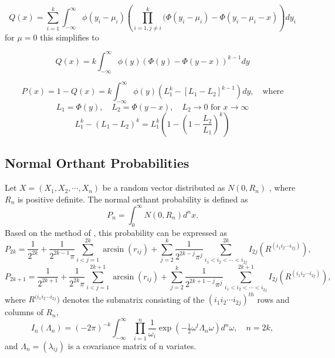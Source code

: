 \begin{equation}
	Q(x) = \sum_{i=1}^k  \int_{-\infty}^\infty \phi(y_i - \mu_i) \left( \prod_{i=1, j \neq i}^k (\Phi(y_i - \mu_i) - \Phi(y_i - \mu_i -x) \right) dy_i
\end{equation}
for $\mu=0$ this simplifies to

\begin{equation}
	Q(x) = k  \int_{-\infty}^\infty \phi(y) \left( \Phi(y) - \Phi(y-x) \right)^{k-1} dy
\end{equation}

\begin{equation}
	P(x) = 1 - Q(x) = k  \int_{-\infty}^\infty \phi(y) \left( L_1^k - [L_1 - L_2]^{k-1} \right) dy, \quad \text{where}
\end{equation}
\begin{equation}
	L_1 = \Phi(y), \quad L_2 = \Phi(y-x), \quad L_2 \rightarrow 0 \text{ for } x \rightarrow \infty
\end{equation}
\begin{equation}
	L_1^k - (L_1 - L_2)^k = L_1^k \left( 1 - \left( 1 - \frac{L_2}{L_1} \right) ^k \right) 
\end{equation}





\subsection{Normal Orthant Probabilities}
\label{NormalOrthantProbabilities}
Let $X=(X_1, X_2, \cdots , X_n)$  be a random vector distributed as $N(0,R_n)$ , where $R_n$ is positive definite. The normal orthant probability is defined as
\begin{equation}
	P_n = \int_0^\infty N(0,R_n) d^n x.
\end{equation}
Based on the method of \cite{Sun_1988_Therory, Sun_1988_Computation}, this probability can be expressed as
\begin{equation}
	P_{2k}=  \frac{1}{2^{2k}} + \frac{1}{2^{2k-1}\pi} \sum_{i<j=1}^{2k}{\arcsin(r_{ij})} + \sum_{j=2}^{k}{\frac{1}{2^{2k-j}\pi^j}}   \sum_{i_1<i_2<\cdots<i_{2j}}^{2k}{I_{2j}(R^{(i_1i_2\cdots i_{2j})})},    
\end{equation}
\begin{equation}
	P_{2k+1}=  \frac{1}{2^{2k+1}} + \frac{1}{2^{2k}\pi} \sum_{i<j=1}^{2k+1}{\arcsin(r_{ij})} + \sum_{j=2}^{k}{\frac{1}{2^{2k+1-j}\pi^j}}   \sum_{i_1<i_2<\cdots<i_{2j}}^{2k+1}{I_{2j}(R^{(i_1i_2\cdots i_{2j})})},    
\end{equation}
where $R^{(i_1i_2\cdots i_{2j}})$ denotes the submatrix consisting of the $(i_1i_2\cdots i_{2j})^{th}$ rows and columns of $R_n$,
\begin{equation}
	I_n(\Lambda_n) = (-2\pi)^{-k}  \int_{-\infty}^\infty \prod_{i=1}^n \frac{1}{\omega_i} \exp(-\tfrac{1}{2} \omega^t \Lambda_n \omega) d^n \omega, \quad n=2k,
\end{equation}
and $\Lambda_n=(\lambda_{ij})$ is a covariance matrix of n variates.

